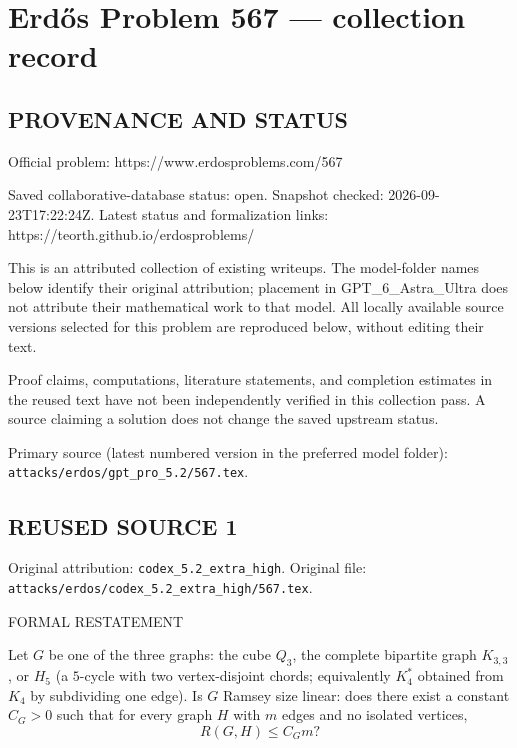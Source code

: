 \section*{Erd\H{o}s Problem 567 --- collection record}

\subsection*{PROVENANCE AND STATUS}
Official problem: https://www.erdosproblems.com/567

Saved collaborative-database status: open.
Snapshot checked: 2026-09-23T17:22:24Z.
Latest status and formalization links: https://teorth.github.io/erdosproblems/

This is an attributed collection of existing writeups. The model-folder names below identify their original attribution; placement in GPT\_6\_Astra\_Ultra does not attribute their mathematical work to that model. All locally available source versions selected for this problem are reproduced below, without editing their text.

Proof claims, computations, literature statements, and completion estimates in the reused text have not been independently verified in this collection pass. A source claiming a solution does not change the saved upstream status.

Primary source (latest numbered version in the preferred model folder): \texttt{attacks/erdos/gpt\_pro\_5.2/567.tex}.

\subsection*{REUSED SOURCE 1}
Original attribution: \texttt{codex\_5.2\_extra\_high}.
Original file: \texttt{attacks/erdos/codex\_5.2\_extra\_high/567.tex}.

FORMAL RESTATEMENT

Let $G$ be one of the three graphs: the cube $Q_3$, the complete bipartite graph $K_{3,3}$, or $H_5$ (a $5$-cycle with two vertex-disjoint chords; equivalently $K_4^*$ obtained from $K_4$ by subdividing one edge).
Is $G$ Ramsey size linear: does there exist a constant $C_G>0$ such that for every graph $H$ with $m$ edges and no isolated vertices,
\[
R(G,H) \le C_G m?
\]

